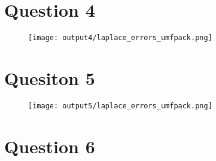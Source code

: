 \documentclass[11pt,a4paper]{report}
\begin{document}
		\section*{Question 4}
		
			\begin{figure}[H]
				\centering
				\texttt{[image: output4/laplace\_errors\_umfpack.png]}
			\end{figure}
		\section*{Quesiton 5}
		
			\begin{figure}[H]
				\centering
				\texttt{[image: output5/laplace\_errors\_umfpack.png]}
			\end{figure}
		
		\section*{Question 6}
\end{document}
